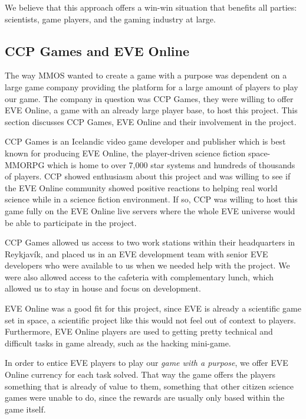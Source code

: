 	We believe that this approach offers a win-win situation that benefits all parties: scientists, game players, and the gaming industry at large. 


\subsection{CCP Games and EVE Online}
	The way MMOS wanted to create a game with a purpose was dependent on a large game company providing the platform for a large amount of players to play our game. The company in question was CCP Games, they were willing to offer EVE Online, a game with an already large player base, to host this project. This section discusses CCP Games, EVE Online and their involvement in the project.

	CCP Games is an Icelandic video game developer and publisher which is best known for producing EVE Online, the player-driven science fiction space-MMORPG which is home to over 7,000 star systems and hundreds of thousands of players. CCP showed enthusiasm about this project and was willing to see if the EVE Online community showed positive reactions to helping real world science while in a science fiction environment. If so, CCP was willing to host this game fully on the EVE Online live servers where the whole EVE universe would be able to participate in the project.

	CCP Games allowed us access to two work stations within their headquarters in Reykjavík, and placed us in an EVE development team with senior EVE developers who were available to us when we needed help with the project. We were also allowed access to the cafeteria with complementary lunch, which allowed us to stay in house and focus on development.

	EVE Online was a good fit for this project, since EVE is already a scientific game set in space, a scientific project like this would not feel out of context to players. Furthermore, EVE Online players are used to getting pretty technical and difficult tasks in game already, such as the hacking mini-game.

	In order to entice EVE players to play our \emph{game with a purpose}, we offer EVE Online currency for each task solved. That way the game offers the players something that is already of value to them, something that other citizen science games were unable to do, since the rewards are usually only based within the game itself.

